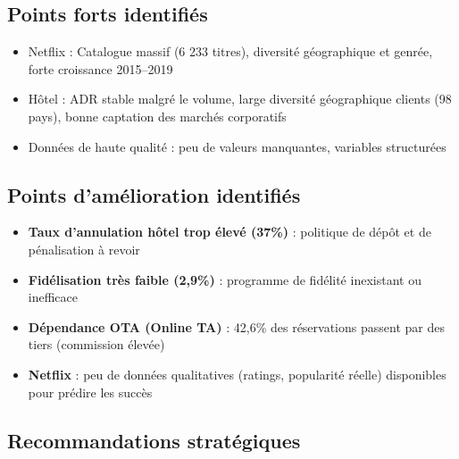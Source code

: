 \documentclass[12pt,a4paper]{article}
\begin{document}
\subsection{Points forts identifiés}

\begin{tcolorbox}[colback=green!5!white, colframe=green, title=\textcolor{white}{\textbf{Points forts}}]
  \begin{itemize}
    \item Netflix : Catalogue massif (6 233 titres), diversité géographique et genrée, forte croissance 2015--2019
    \item Hôtel : ADR stable malgré le volume, large diversité géographique clients (98 pays), bonne captation des marchés corporatifs
    \item Données de haute qualité : peu de valeurs manquantes, variables structurées
  \end{itemize}
\end{tcolorbox}

\vspace{0.5cm}

\subsection{Points d'amélioration identifiés}

\begin{tcolorbox}[colback=danger!5!white, colframe=danger, title=\textcolor{white}{\textbf{Points d'amélioration}}]
  \begin{itemize}
    \item \textbf{Taux d'annulation hôtel trop élevé (37\%)} : politique de dépôt et de pénalisation à revoir
    \item \textbf{Fidélisation très faible (2,9\%)} : programme de fidélité inexistant ou inefficace
    \item \textbf{Dépendance OTA (Online TA)} : 42,6\% des réservations passent par des tiers (commission élevée)
    \item \textbf{Netflix} : peu de données qualitatives (ratings, popularité réelle) disponibles pour prédire les succès
  \end{itemize}
\end{tcolorbox}

\vspace{0.5cm}

\subsection{Recommandations stratégiques}
\end{document}
